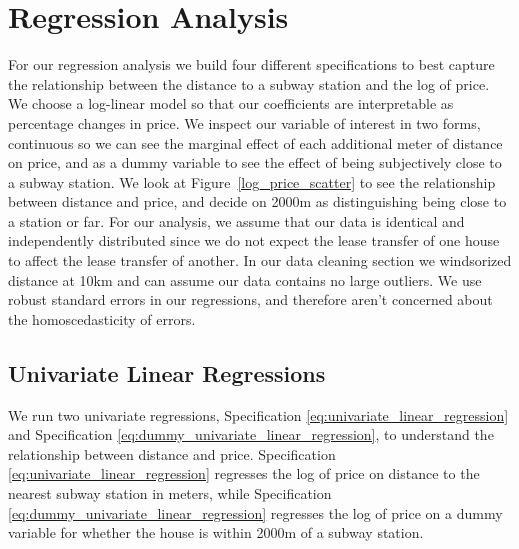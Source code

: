 \section{Regression Analysis}
\label{sec:regression_analysis}

For our regression analysis we build four different specifications to best capture the 
relationship between the distance to a subway station and the log of price. We choose a log-linear model so that our coefficients
are interpretable as percentage changes in price. We inspect our variable of interest in two forms, continuous so we can 
see the marginal effect of each additional meter of distance on price, and as a dummy variable to see the effect of being subjectively close to a subway station.
We look at Figure~\ref{log_price_scatter} to see the relationship between distance and price, and decide on 2000m as distinguishing being close to a station or far.
For our analysis, we assume that our data is identical and independently distributed since we do not expect the lease transfer of one house to affect the lease transfer of another.
In our data cleaning section we windsorized distance at 10km and can assume our data contains no large outliers.
We use robust standard errors in our regressions, and therefore aren't concerned about the homoscedasticity of errors.

\subsection{Univariate Linear Regressions}
We run two univariate regressions, Specification \ref{eq:univariate_linear_regression} and Specification \ref{eq:dummy_univariate_linear_regression}, to understand the relationship between distance and price.
Specification \ref{eq:univariate_linear_regression} regresses the log of price on distance to the nearest subway station in meters, while Specification \ref{eq:dummy_univariate_linear_regression} regresses the log of price on a dummy variable for whether the house is within 2000m of a subway station.

